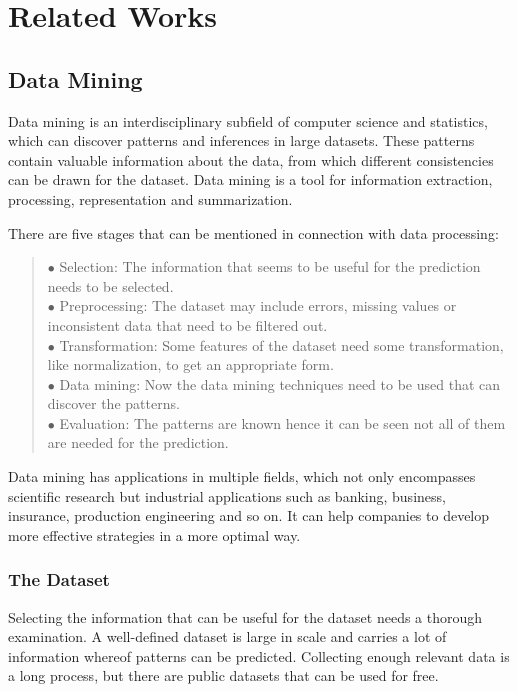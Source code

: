 \chapter{Related Works}

\section{Data Mining}

Data mining \cite{zaki2010advances, han2011data} is an interdisciplinary subfield of computer science and statistics, which can discover patterns and inferences in large datasets. These patterns contain valuable information about the data, from which different consistencies can be drawn for the dataset. Data mining is a tool for information extraction, processing, representation and summarization. 

\medskip \noindent There are five stages that can be mentioned in connection with data processing:
\begin{verse}
	$\bullet$ Selection: The information that seems to be useful for the prediction needs to be selected.\\
	$\bullet$ Preprocessing: The dataset may include errors, missing values or inconsistent data that need to be filtered out.\\
	$\bullet$ Transformation: Some features of the dataset need some transformation, like normalization, to get an appropriate form.\\
	$\bullet$ Data mining: Now the data mining techniques need to be used that can discover the patterns.\\
	$\bullet$ Evaluation: The patterns are known hence it can be seen not all of them are needed for the prediction.
\end{verse}

Data mining has applications in multiple fields, which not only encompasses scientific research but industrial applications such as banking, business, insurance, production engineering and so on. It can help companies to develop more effective strategies in a more optimal way.



\subsection{The Dataset}

Selecting the information that can be useful for the dataset needs a thorough examination. A well-defined dataset is large in scale and carries a lot of information whereof patterns can be predicted. Collecting enough relevant data is a long process, but there are public datasets that can be used for free. \medskip

